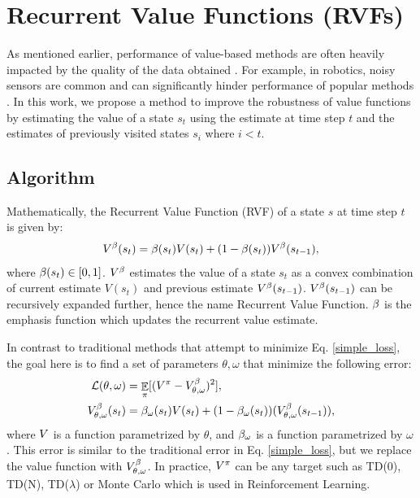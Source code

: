 \section{Recurrent Value Functions (RVFs)}
\label{RLRL}
As mentioned earlier, performance of value-based methods are often heavily impacted by the quality of the data obtained \citep{fox2015taming,pendrith1994reinforcement}. For example, in robotics, noisy sensors are common and can significantly hinder performance of popular methods \citep{romoff2018reward}. In this work, we propose a method to improve the robustness of value functions by estimating the value of a state $s_t$ using the estimate at time step $t$ and the estimates of previously visited states $s_i$ where $i < t$.
\subsection{Algorithm}
Mathematically, the Recurrent Value Function (RVF) of a state $s$ at time step $t$ is given by:
\begin{equation}
\label{value}
\begin{split}
    V^{\beta} (s_t) &= \beta(s_t) V(s_t) + (1 - \beta(s_t)) V^{\beta} (s_{t-1}), \\ 
\end{split}
\end{equation}
where  $\beta(s_t) \in [0,1]$. $V^{\beta}$ estimates the value of a state $s_t$ as a convex combination of current estimate $V(s_t)$ and previous estimate $V^{\beta}(s_{t-1})$. $V^{\beta}(s_{t-1})$ can be recursively expanded further, hence the name Recurrent Value Function. $\beta$ is the emphasis function which updates the recurrent value estimate. 

In contrast to traditional methods that attempt to minimize Eq. \ref{simple_loss}, the goal here is to find a set of parameters $\theta,\omega$ that minimize the following error:
\begin{equation}
\begin{split}
    \mathcal{L}(\theta,\omega) &= \mathop{\mathbb{E}}_{\pi} [(V^{\pi} - V^{\beta}_{\theta,\omega})^2], \\
	 V^{\beta}_{\theta,\omega}(s_t) &= \beta_{\omega}(s_t) V(s_t) + (1 - \beta_{\omega}(s_t)) (V^{\beta}_{\theta,\omega}(s_{t-1})),
\end{split}
\label{loss_beta}
\end{equation}
where $V$ is a function parametrized by $\theta$, and $\beta_{\omega}$ is a function parametrized by $\omega$.
This error is similar to the traditional error in Eq. \ref{simple_loss}, but we replace the value function with $V^{\beta}_{\theta,\omega}$. In practice, $V^{\pi}$ can be any target such as TD(0), TD(N), TD($\lambda$) or Monte Carlo \citep{sutton1998reinforcement} which is used in Reinforcement Learning.


